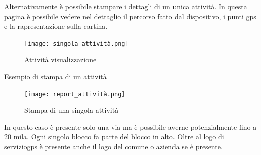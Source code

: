 \documentclass[12pt]{article}
\begin{document}
Alternativamente è possibile stampare i dettagli di un unica attività. 
In questa pagina è possibile vedere nel dettaglio il percorso fatto 
dal dispositivo, i punti gps e la rapresentazione sulla cartina. 
\begin{figure}[H]
\texttt{[image: singola\_attività.png]}
\caption{Attività visualizzazione}
\label{fig:mesh5}
\end{figure}
Esempio di stampa di un attività 
\begin{figure}[H]
\texttt{[image: report\_attività.png]}
\caption{Stampa di una singola attività}
\label{fig:mesh6}
\end{figure}
In questo caso è presente solo una via ma è possibile averne potenzialmente 
fino a 20 mila. Ogni singolo blocco fa parte del blocco in alto.  
Oltre al logo di serviziogps è presente anche il logo del comune o azienda 
se è presente. 
\end{document}
